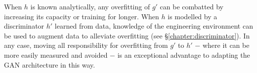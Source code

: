 \documentclass[../../main.tex]{subfiles}
\begin{document}
When $h$ is known analytically, any overfitting of $g'$ can be combatted by increasing its capacity or training for longer.
When $h$ is modelled by a discriminator $h'$ learned from data, knowledge of the engineering environment can be used to augment data to alleviate overfitting (see \S\ref{chapter:discriminator}).
In any case, moving all responsibility for overfitting from $g'$ to $h'$ $-$ where it can be more easily measured and avoided $-$ is an exceptional advantage to adapting the GAN architecture in this way.
\end{document}
